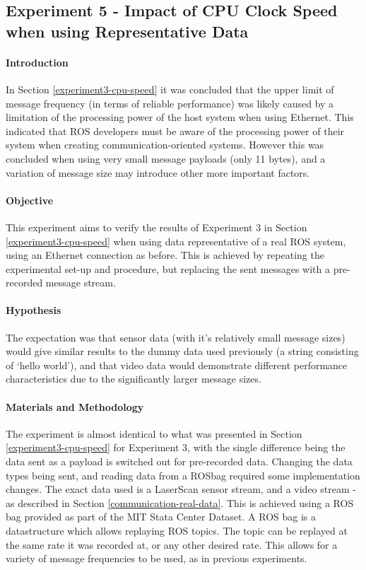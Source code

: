 \documentclass[../dissertation.tex]{subfiles}
\begin{document}
\subsection{Experiment 5 - Impact of CPU Clock Speed when using Representative Data}
\label{exp-5}

\paragraph{Introduction} In Section \ref{experiment3-cpu-speed} it was concluded that the upper limit of message frequency (in terms of reliable performance) was likely caused by a limitation of the processing power of the host system when using Ethernet. This indicated that ROS developers must be aware of the processing power of their system when creating communication-oriented systems. However this was concluded when using very small message payloads (only 11 bytes), and a variation of message size may introduce other more important factors.

\paragraph{Objective} This experiment aims to verify the results of Experiment 3 in Section \ref{experiment3-cpu-speed} when using data representative of a real ROS system, using an Ethernet connection as before. This is achieved by repeating the experimental set-up and procedure, but replacing the sent messages with a pre-recorded message stream.

\paragraph{Hypothesis} The expectation was that sensor data (with it's relatively small message sizes) would give similar results to the dummy data used previously (a string consisting of `hello world'), and that video data would demonstrate different performance characteristics due to the significantly larger message sizes.

\paragraph{Materials and Methodology} The experiment is almost identical to what was presented in Section \ref{experiment3-cpu-speed} for Experiment 3, with the single difference being the data sent as a payload is switched out for pre-recorded data. Changing the data types being sent, and reading data from a ROSbag required some implementation changes\cite{Experiment5ROSbagCode}. The exact data used is a LaserScan sensor stream, and a video stream - as described in Section \ref{communication-real-data}. This is achieved using a ROS bag provided as part of the MIT Stata Center Dataset. A ROS bag is a datastructure which allows replaying ROS topics. The topic can be replayed at the same rate it was recorded at, or any other desired rate. This allows for a variety of message frequencies to be used, as in previous experiments.
\end{document}
